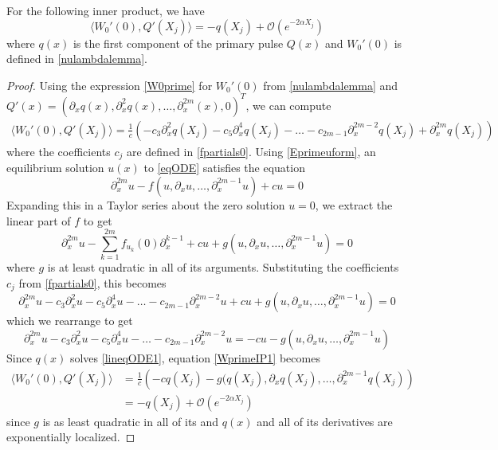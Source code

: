 \documentclass[thesis.tex]{subfiles}
\begin{document}
\begin{lemma}\label{lemma:WprimeIP}
For the following inner product, we have
\begin{equation}\label{WprimeIP}
\langle W_0'(0), Q'(X_j) \rangle = -q(X_j) + \mathcal{O}(e^{-2\alpha X_j})
\end{equation}
where $q(x)$ is the first component of the primary pulse $Q(x)$ and $W_0'(0)$ is defined in \cref{nulambdalemma}.
\begin{proof}
Using the expression \cref{W0prime} for $W_0'(0)$ from \cref{nulambdalemma} and $Q'(x) = (\partial_x q(x), \partial_x^2 q(x), \dots, \partial_x^{2m}(x), 0)^T$, we can compute
\begin{align}\label{WprimeIP1}
\langle W_0'(0), Q'(X_j) \rangle = 
\frac{1}{c} \left( -c_3 \partial_x^2 q(X_j) -c_5 \partial_x^4 q(X_j) -\dots -c_{2m-1} \partial_x^{2m-2} q(X_j) + \partial_x^{2m} q(X_j) \right)
\end{align}
where the coefficients $c_j$ are defined in \cref{fpartials0}. Using \cref{Eprimeuform}, an equilibrium solution $u(x)$ to \cref{eqODE} satisfies the equation
\[
\partial_x^{2m} u- f(u, \partial_x u, \dots, \partial_x^{2m-1}u ) + cu = 0
\]
Expanding this in a Taylor series about the zero solution $u = 0$, we extract the linear part of $f$  to get
\[
\partial_x^{2m} u - \sum_{k=1}^{2m} f_{u_k}(0) \partial_x^{k-1} + cu + g(u, \partial_x u, \dots, \partial_x^{2m-1}u ) = 0
\]
where $g$ is at least quadratic in all of its arguments. Substituting the coefficients $c_j$ from \cref{fpartials0}, this becomes
\begin{equation*}
\partial_x^{2m} u - c_3 \partial_x^2 u - c_5 \partial_x^4 u - \dots - c_{2m-1} \partial_x^{2m-2}u + cu + g(u, \partial_x u, \dots, \partial_x^{2m-1}u ) = 0
\end{equation*}
which we rearrange to get 
\begin{equation}\label{lineqODE1}
\partial_x^{2m} u - c_3 \partial_x^2 u - c_5 \partial_x^4 u - \dots - c_{2m-1} \partial_x^{2m-2}u = -cu - g(u, \partial_x u, \dots, \partial_x^{2m-1}u )
\end{equation}
Since $q(x)$ solves \cref{lineqODE1}, equation \cref{WprimeIP1} becomes
\begin{align*}
\langle W_0'(0), Q'(X_j) \rangle &= 
\frac{1}{c} \left( -cq(X_j) - g(q(X_j), \partial_x q(X_j), \dots, \partial_x^{2m-1}q(X_j) \right) \\
&= -q(X_j) + \mathcal{O}(e^{-2\alpha X_j})
\end{align*}
since $g$ is as least quadratic in all of its and $q(x)$ and all of its derivatives are exponentially localized.
\end{proof}
\end{lemma}
\end{document}
